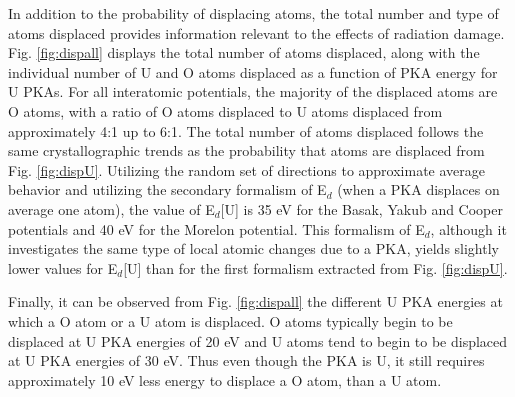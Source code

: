\documentclass[review]{elsarticle}
\begin{document}
\FloatBarrier

In addition to the probability of displacing atoms, the total number and type of atoms displaced provides information relevant to the effects of radiation damage. Fig. \ref{fig:dispall} displays the total number of atoms displaced, along with the individual number of U and O atoms displaced as a function of PKA energy for U PKAs. For all interatomic potentials, the majority of the displaced atoms are O atoms, with a ratio of O atoms displaced to U atoms displaced from approximately 4:1 up to 6:1. The total number of atoms displaced follows the same crystallographic trends as the probability that atoms are displaced from Fig. \ref{fig:dispU}. Utilizing the random set of directions to approximate average behavior and utilizing the secondary formalism of E$_d$ (when a PKA displaces on average one atom), the value of E$_d$[U] is 35 eV for the Basak, Yakub and Cooper potentials and 40 eV for the Morelon potential. This formalism of E$_d$, although it investigates the same type of local atomic changes due to a PKA, yields slightly lower values for E$_d$[U] than for the first formalism extracted from Fig. \ref{fig:dispU}.

Finally, it can be observed from Fig. \ref{fig:dispall} the different U PKA energies at which a O atom or a U atom is displaced. O atoms typically begin to be displaced at U PKA energies of 20 eV and U atoms tend to begin to be displaced at U PKA energies of 30 eV. Thus even though the PKA is U, it still requires approximately 10 eV less energy to displace a O atom, than a U atom.
\end{document}
